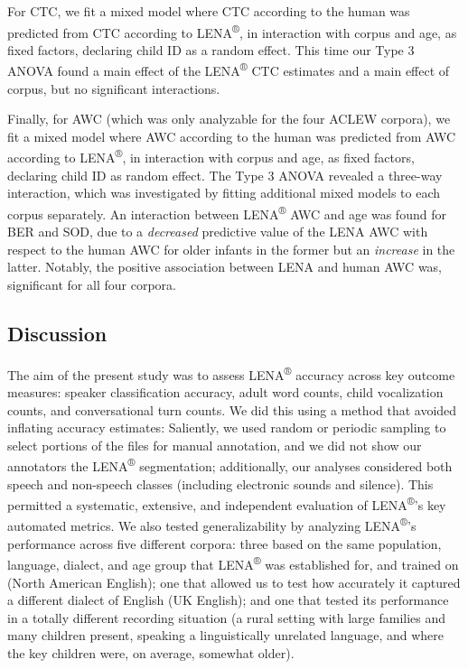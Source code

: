 \documentclass[english,table,man,floatsintext]{apa6}
\begin{document}
For CTC, we fit a mixed model where CTC according to the human was predicted from CTC according to LENA\textsuperscript{®}, in interaction with corpus and age, as fixed factors, declaring child ID as a random effect. This time our Type 3 ANOVA found a main effect of the LENA\textsuperscript{®} CTC estimates and a main effect of corpus, but no significant interactions.

Finally, for AWC (which was only analyzable for the four ACLEW corpora), we fit a mixed model where AWC according to the human was predicted from AWC according to LENA\textsuperscript{®}, in interaction with corpus and age, as fixed factors, declaring child ID as random effect. The Type 3 ANOVA revealed a three-way interaction, which was investigated by fitting additional mixed models to each corpus separately. An interaction between LENA\textsuperscript{®} AWC and age was found for BER and SOD, due to a \emph{decreased} predictive value of the LENA AWC with respect to the human AWC for older infants in the former but an \emph{increase} in the latter. Notably, the positive association between LENA and human AWC was, significant for all four corpora.

\hypertarget{discussion}{%
\subsection{Discussion}\label{discussion}}

The aim of the present study was to assess LENA\textsuperscript{®} accuracy across key outcome measures: speaker classification accuracy, adult word counts, child vocalization counts, and conversational turn counts. We did this using a method that avoided inflating accuracy estimates: Saliently, we used random or periodic sampling to select portions of the files for manual annotation, and we did not show our annotators the LENA\textsuperscript{®} segmentation; additionally, our analyses considered both speech and non-speech classes (including electronic sounds and silence). This permitted a systematic, extensive, and independent evaluation of LENA\textsuperscript{®}'s key automated metrics. We also tested generalizability by analyzing LENA\textsuperscript{®}'s performance across five different corpora: three based on the same population, language, dialect, and age group that LENA\textsuperscript{®} was established for, and trained on (North American English); one that allowed us to test how accurately it captured a different dialect of English (UK English); and one that tested its performance in a totally different recording situation (a rural setting with large families and many children present, speaking a linguistically unrelated language, and where the key children were, on average, somewhat older).
\end{document}
